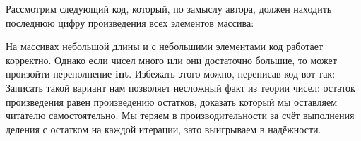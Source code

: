 \begin{typerror}
	\label{TE_avoidable-overflow}

	Рассмотрим следующий код, который, по замыслу автора, должен находить последнюю цифру произведения всех элементов массива:

	На массивах небольшой длины и с небольшими элементами код работает корректно.
	Однако если чисел много или они достаточно большие, то может произойти переполнение \textbf{int}.
	Избежать этого можно, переписав код вот так:
	Записать такой вариант нам позволяет несложный факт из теории чисел: остаток произведения равен произведению остатков, доказать который мы оставляем читателю самостоятельно.
	Мы теряем в производительности за счёт выполнения деления с остатком на каждой итерации, зато выигрываем в надёжности.
\end  {typerror}

